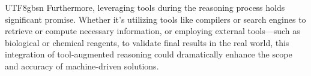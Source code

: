 \documentclass[11pt, a4paper, logo, copyright, nonumbering]{deepseek}
\begin{document}
\begin{CJK*}{UTF8}{gbsn}
 Furthermore, leveraging tools during the reasoning process holds significant promise. Whether it’s utilizing tools like compilers or search engines to retrieve or compute necessary information, or employing external tools—such as biological or chemical reagents, to validate final results in the real world, this integration of tool-augmented reasoning could dramatically enhance the scope and accuracy of machine-driven solutions.








\end{CJK*}
\end{document}
